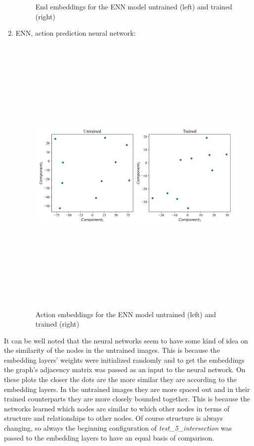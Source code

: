\documentclass[
]{elteikthesis}[2023/04/10]
\begin{document}
\begin{enumerate}
\begin{figure}[H]
\begin{centering}
\par\end{centering}
\caption{End embeddings for the ENN model untrained (left) and trained (right)}

\end{figure}
\item ENN, action prediction neural network:
\begin{figure}[H]
\begin{centering}
\includegraphics[width=14cm,height=14cm,keepaspectratio]{images/embeddings_before_after_action_enn_2023-05-05_22-54}
\par\end{centering}
\caption{Action embeddings for the ENN model untrained (left) and trained (right)}
\end{figure}
\end{enumerate}
It can be well noted that the neural networks seem to have some kind
of idea on the similarity of the nodes in the untrained images. This
is because the embedding layers' weights were initialized randomly
and to get the embeddings the graph's adjacency matrix was passed
as an input to the neural network. On these plots the closer the dots
are the more similar they are according to the embedding layers. In
the untrained images they are more spaced out and in their trained
counterparts they are more closely bounded together. This is because
the networks learned which nodes are similar to which other nodes
in terms of structure and relationships to other nodes. Of course
structure is always changing, so always the beginning configuration
of \emph{test\_5\_intersection} was passed to the embedding layers
to have an equal basis of comparison. 
\end{document}

